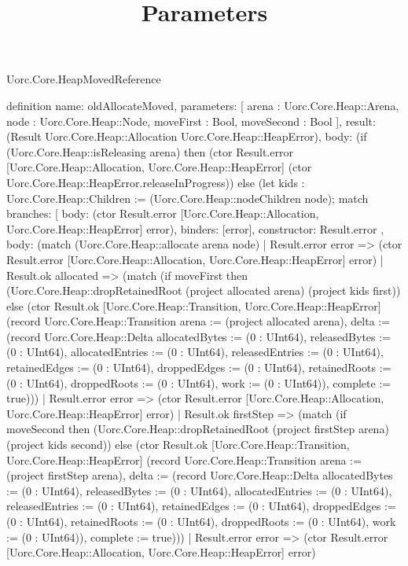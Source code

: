 \begin{lexlean}{Uorc.Core.HeapMovedReference}
\title{Parameters}
\begin{semanticmodule}
definition{
  name: oldAllocateMoved,
  parameters: [
    arena : Uorc.Core.Heap::Arena,
    node : Uorc.Core.Heap::Node,
    moveFirst : Bool,
    moveSecond : Bool
  ],
  result: (Result Uorc.Core.Heap::Allocation Uorc.Core.Heap::HeapError),
  body: (if (Uorc.Core.Heap::isReleasing arena) then (ctor Result.error [Uorc.Core.Heap::Allocation, Uorc.Core.Heap::HeapError] (ctor Uorc.Core.Heap::HeapError.releaseInProgress)) else (let kids : Uorc.Core.Heap::Children := (Uorc.Core.Heap::nodeChildren node); match{
    branches: [
      {
        body: (ctor Result.error [Uorc.Core.Heap::Allocation, Uorc.Core.Heap::HeapError] error),
        binders: [error],
        constructor: Result.error
      },
      {
        body: (match (Uorc.Core.Heap::allocate arena node)
          | Result.error error => (ctor Result.error [Uorc.Core.Heap::Allocation, Uorc.Core.Heap::HeapError] error)
          | Result.ok allocated => (match (if moveFirst then (Uorc.Core.Heap::dropRetainedRoot (project allocated arena) (project kids first)) else (ctor Result.ok [Uorc.Core.Heap::Transition, Uorc.Core.Heap::HeapError] (record Uorc.Core.Heap::Transition {arena := (project allocated arena), delta := (record Uorc.Core.Heap::Delta {allocatedBytes := (0 : UInt64), releasedBytes := (0 : UInt64), allocatedEntries := (0 : UInt64), releasedEntries := (0 : UInt64), retainedEdges := (0 : UInt64), droppedEdges := (0 : UInt64), retainedRoots := (0 : UInt64), droppedRoots := (0 : UInt64), work := (0 : UInt64)}), complete := true})))
            | Result.error error => (ctor Result.error [Uorc.Core.Heap::Allocation, Uorc.Core.Heap::HeapError] error)
            | Result.ok firstStep => (match (if moveSecond then (Uorc.Core.Heap::dropRetainedRoot (project firstStep arena) (project kids second)) else (ctor Result.ok [Uorc.Core.Heap::Transition, Uorc.Core.Heap::HeapError] (record Uorc.Core.Heap::Transition {arena := (project firstStep arena), delta := (record Uorc.Core.Heap::Delta {allocatedBytes := (0 : UInt64), releasedBytes := (0 : UInt64), allocatedEntries := (0 : UInt64), releasedEntries := (0 : UInt64), retainedEdges := (0 : UInt64), droppedEdges := (0 : UInt64), retainedRoots := (0 : UInt64), droppedRoots := (0 : UInt64), work := (0 : UInt64)}), complete := true})))
              | Result.error error => (ctor Result.error [Uorc.Core.Heap::Allocation, Uorc.Core.Heap::HeapError] error)
}}}
\end{semanticmodule}
\end{lexlean}
